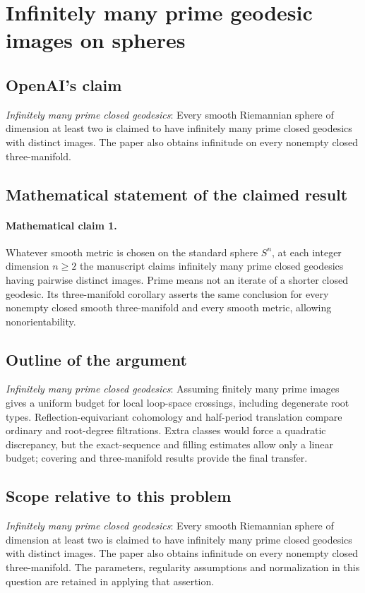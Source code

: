 \documentclass[11pt]{article}
\begin{document}
\section*{Infinitely many prime geodesic images on spheres}

\subsection{OpenAI's claim}
\textit{Infinitely many prime closed geodesics}: Every smooth Riemannian sphere of dimension at least two is claimed to have infinitely many prime closed geodesics with distinct images. The paper also obtains infinitude on every nonempty closed three-manifold.

\subsection{Mathematical statement of the claimed result}
\paragraph{Mathematical claim 1.} Whatever smooth metric is chosen on the standard sphere $S^n$, at each integer dimension $n\ge2$ the manuscript claims infinitely many prime closed geodesics having pairwise distinct images. Prime means not an iterate of a shorter closed geodesic. Its three-manifold corollary asserts the same conclusion for every nonempty closed smooth three-manifold and every smooth metric, allowing nonorientability.

\subsection{Outline of the argument}
\textit{Infinitely many prime closed geodesics}: Assuming finitely many prime images gives a uniform budget for local loop-space crossings, including degenerate root types. Reflection-equivariant cohomology and half-period translation compare ordinary and root-degree filtrations. Extra classes would force a quadratic discrepancy, but the exact-sequence and filling estimates allow only a linear budget; covering and three-manifold results provide the final transfer.

\subsection{Scope relative to this problem}
\textit{Infinitely many prime closed geodesics}: Every smooth Riemannian sphere of dimension at least two is claimed to have infinitely many prime closed geodesics with distinct images. The paper also obtains infinitude on every nonempty closed three-manifold. The parameters, regularity assumptions and normalization in this question are retained in applying that assertion.
\end{document}
